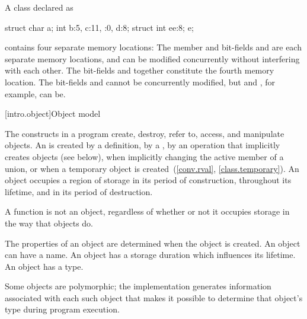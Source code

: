 \pnum
\begin{example}
A class declared as
\begin{codeblock}
struct {
  char a;
  int b:5,
  c:11,
  :0,
  d:8;
  struct {int ee:8;} e;
}
\end{codeblock}
contains four separate memory locations: The member  and bit-fields
 and  are each separate memory locations, and can be
modified concurrently without interfering with each other. The bit-fields
 and  together constitute the fourth memory location. The
bit-fields  and  cannot be concurrently modified, but
 and , for example, can be.
\end{example}

[intro.object]{Object model}

\pnum
{}%
The constructs in a \Cpp{} program create, destroy, refer to, access, and
manipulate objects.
An  is created
by a definition,
by a ,
by an operation that implicitly creates objects (see below),
when implicitly changing the active member of a union,
or
when a temporary object is created~(\ref{conv.rval}, \ref{class.temporary}).
An object occupies a region of storage
in its period of construction,
throughout its lifetime,
and
in its period of destruction.
\begin{note}
A function is not an object, regardless of whether or not it
occupies storage in the way that objects do.
\end{note}
The properties of an
object are determined when the object is created. An object can have a
name. An object has a storage
duration which influences its
lifetime. An object has a
type.
\begin{note}
Some objects are
polymorphic; the implementation
generates information associated with each such object that makes it
possible to determine that object's type during program execution.
\end{note}

